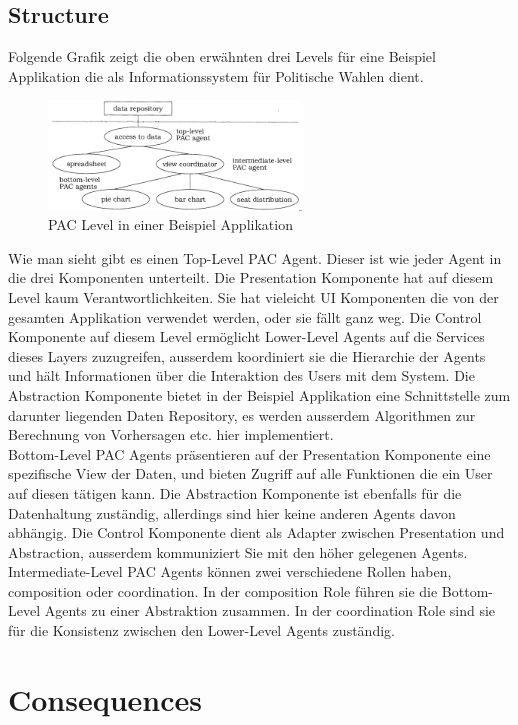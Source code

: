 \subsection{Structure}
Folgende Grafik zeigt die oben erwähnten drei Levels für eine Beispiel Applikation die als Informationssystem für Politische Wahlen dient. 
\begin{figure}[H]
	\centering
	\includegraphics[width=0.6\textwidth]{figures/04-pac-1}
	\caption{PAC Level in einer Beispiel Applikation}
\end{figure}
Wie man sieht gibt es einen Top-Level PAC Agent. Dieser ist wie jeder Agent in die drei Komponenten unterteilt. Die Presentation Komponente hat auf diesem Level kaum Verantwortlichkeiten. Sie hat vieleicht UI Komponenten die von der gesamten Applikation verwendet werden, oder sie fällt ganz weg. 
Die Control Komponente auf diesem Level ermöglicht Lower-Level Agents auf die Services dieses Layers zuzugreifen, ausserdem koordiniert sie die Hierarchie der Agents und hält Informationen über die Interaktion des Users mit dem System.
Die Abstraction Komponente bietet in der Beispiel Applikation eine Schnittstelle zum darunter liegenden Daten Repository, es werden ausserdem Algorithmen zur Berechnung von Vorhersagen etc. hier implementiert. \\
Bottom-Level PAC Agents präsentieren auf der Presentation Komponente eine spezifische View der Daten, und bieten Zugriff auf alle Funktionen die ein User auf diesen tätigen kann. Die Abstraction Komponente ist ebenfalls für die Datenhaltung zuständig, allerdings sind hier keine anderen Agents davon abhängig. Die Control Komponente dient als Adapter zwischen Presentation und Abstraction, ausserdem kommuniziert Sie mit den höher gelegenen Agents. \\
Intermediate-Level PAC Agents können zwei verschiedene Rollen haben, composition oder coordination. In der composition Role führen sie die Bottom-Level Agents zu einer Abstraktion zusammen. In der coordination Role sind sie für die Konsistenz zwischen den Lower-Level Agents zuständig. 

\section{Consequences}
\begin{itemize}
\end{itemize}

